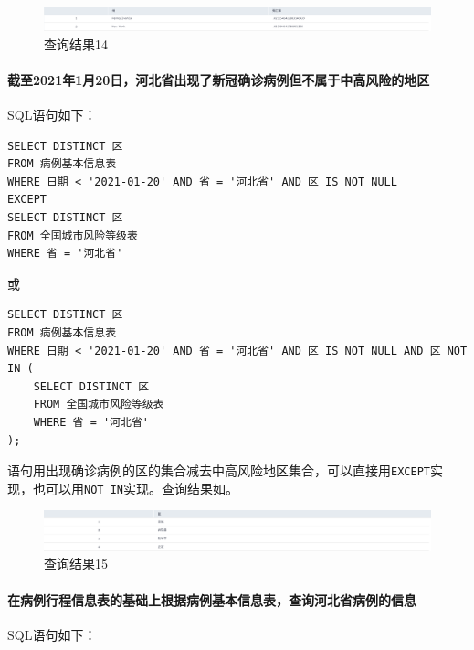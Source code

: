 \documentclass[lang=cn,11pt,a4paper,cite=authornum]{paper}
\begin{document}
\begin{figure}[!htb]
    \centering
    \includegraphics[width=\textwidth]{./images/lab1_query14.png}
    \caption{查询结果14\label{fig:query14}}
\end{figure}

\paragraph{截至2021年1月20日，河北省出现了新冠确诊病例但不属于中高风险的地区} SQL语句如下：

\begin{code}
\begin{verbatim}
SELECT DISTINCT 区
FROM 病例基本信息表
WHERE 日期 < '2021-01-20' AND 省 = '河北省' AND 区 IS NOT NULL
EXCEPT 
SELECT DISTINCT 区
FROM 全国城市风险等级表
WHERE 省 = '河北省'
\end{verbatim}
\end{code}

或

\begin{code}
\begin{verbatim}
SELECT DISTINCT 区
FROM 病例基本信息表
WHERE 日期 < '2021-01-20' AND 省 = '河北省' AND 区 IS NOT NULL AND 区 NOT IN (
    SELECT DISTINCT 区
    FROM 全国城市风险等级表
    WHERE 省 = '河北省'
);
\end{verbatim}
\end{code}

语句用出现确诊病例的区的集合减去中高风险地区集合，可以直接用\texttt{EXCEPT}实现，也可以用\texttt{NOT IN}实现。查询结果如。

\begin{figure}[!htb]
    \centering
    \includegraphics[width=\textwidth]{./images/lab1_query15.png}
    \caption{查询结果15\label{fig:query15}}
\end{figure}

\paragraph{在病例行程信息表的基础上根据病例基本信息表，查询河北省病例的信息} SQL语句如下：
\end{document}
